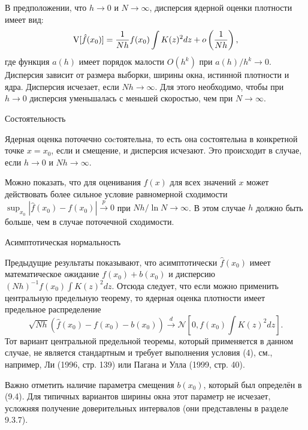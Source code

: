 В предположении, что $h \rightarrow 0$ и $N \rightarrow \infty$, дисперсия ядерной оценки плотности имеет вид:
\begin{equation}
\mathrm{V}[\hat{f}(x_0)] = \frac{1}{Nh} f(x_0) \int K(z)^2dz + o\left( \frac{1}{Nh} \right),
\end{equation}
где функция $a(h)$ имеет порядок малости $O(h^k)$ при $a(h)/h^k \rightarrow 0$. Дисперсия зависит от размера выборки, ширины окна, истинной плотности и ядра. Дисперсия исчезает, если $Nh \rightarrow \infty$. Для этого необходимо, чтобы при $h \rightarrow 0$ дисперсия уменьшалась с меньшей скоростью, чем при $N \rightarrow \infty$.

\begin{center}
Состоятельность
\end{center}

Ядерная оценка поточечно соcтоятельна, то есть она состоятельна в конкретной точке $x = x_0$, если и смещение, и дисперсия исчезают. Это происходит в случае, если $h \rightarrow 0$ и $Nh \rightarrow \infty$.

Можно показать, что для оценивания $f(x)$ для всех значений $x$ может действовать более сильное условие равномерной сходимости $\sup_{x_0} |\hat{f}(x_0) - f(x_0)| \stackrel{p}{\rightarrow} 0$ при $Nh/\ln N \rightarrow \infty$. В этом случае $h$ должно быть больше, чем в случае поточечной сходимости.

\begin{center}
Асимптотическая нормальность
\end{center}

Предыдущие результаты показывают, что асимптотически $\hat{f}(x_0)$ имеет математическое ожидание $f(x_0) + b(x_0)$ и дисперсию $(Nh)^{-1}f(x_0)\int K(z)^2dz$. Отсюда следует, что если можно применить центральную предельную теорему, то ядерная оценка плотности имеет предельное распределение
\begin{equation}
\sqrt{Nh}(\hat{f}(x_0) - f(x_0) - b(x_0)) \stackrel{d}{\rightarrow} \mathcal{N} \left[ 0, f(x_0) \int K(z)^2dz \right].
\end{equation}
Тот вариант центральной предельной теоремы, который применяется в данном случае, не является стандартным и требует выполнения условия (4), см., например, Ли (1996, стр. 139) или Пагана и Улла (1999, стр. 40).

Важно отметить наличие параметра смещения $b(x_0)$, который был определён в (9.4). Для типичных вариантов ширины окна этот параметр не исчезает, усложняя получение доверительных интервалов (они представлены в разделе 9.3.7).

